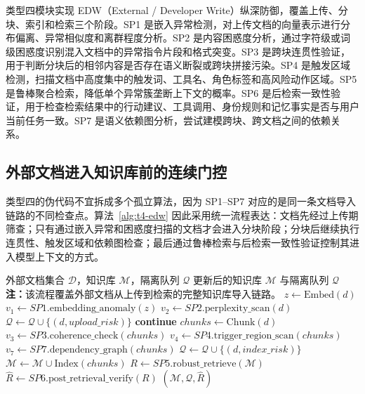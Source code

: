 \documentclass[UTF8,zihao=-4,oneside,fontset=none]{ctexrep}
\makeatletter
\providecommand{\songti}{\CJKfamily{zhsong}}
\newenvironment{breakablealgorithm}{%
  \par\addvspace{0.8em}%
  \zihao{-4}\songti\setstretch{1.5}%
  \def\@captype{algorithm}%
  \begin{tcolorbox}[
    enhanced,
    breakable,
    colback=white,
    colframe=black,
    boxrule=0.6pt,
    arc=0pt,
    outer arc=0pt,
    boxsep=0.35em,
    left=0.8em,
    right=0.8em,
    top=0.45em,
    bottom=0.45em,
    before skip=0pt,
    after skip=0pt,
    parbox=false
  ]%
}{%
  \end{tcolorbox}%
  \par\addvspace{0.8em}%
}
\makeatother
\begin{document}
	类型四模块实现 EDW（External / Developer Write）纵深防御，覆盖上传、分块、索引和检索三个阶段。SP1 是嵌入异常检测，对上传文档的向量表示进行分布偏离、异常相似度和离群程度分析。SP2 是内容困惑度分析，通过字符级或词级困惑度识别混入文档中的异常指令片段和格式突变。SP3 是跨块连贯性验证，用于判断分块后的相邻内容是否存在语义断裂或跨块拼接污染。SP4 是触发区域检测，扫描文档中高度集中的触发词、工具名、角色标签和高风险动作区域。SP5 是鲁棒聚合检索，降低单个异常簇垄断上下文的概率。SP6 是后检索一致性验证，用于检查检索结果中的行动建议、工具调用、身份规则和记忆事实是否与用户当前任务一致。SP7 是语义依赖图分析，尝试建模跨块、跨文档之间的依赖关系。
	
	\subsection{外部文档进入知识库前的连续门控}
	
	类型四的伪代码不宜拆成多个孤立算法，因为 SP1--SP7 对应的是同一条文档导入链路的不同检查点。算法~\ref{alg:t4-edw} 因此采用统一流程表达：文档先经过上传期筛查；只有通过嵌入异常和困惑度扫描的文档才会进入分块阶段；分块后继续执行连贯性、触发区域和依赖图检查；最后通过鲁棒检索与后检索一致性验证控制其进入模型上下文的方式。
	
	\begin{breakablealgorithm}
		\caption{类型四 EDW 外部批量写入纵深防御流程}
		\label{alg:t4-edw}
		\begin{algorithmic}[1]
			\Require 外部文档集合 $\mathcal{D}$，知识库 $\mathcal{M}$，隔离队列 $\mathcal{Q}$
			\Ensure 更新后的知识库 $\mathcal{M}$ 与隔离队列 $\mathcal{Q}$
			\Statex \textbf{注：}该流程覆盖外部文档从上传到检索的完整知识库导入链路。
			\State $z\leftarrow \mathrm{Embed}(d)$ 
			\State $v_1\leftarrow SP1.\mathrm{embedding\_anomaly}(z)$
			\State $v_2\leftarrow SP2.\mathrm{perplexity\_scan}(d)$
			\State $\mathcal{Q}\leftarrow \mathcal{Q}\cup\{(d,upload\_risk)\}$
			\State \textbf{continue}
			\EndIf
			\State $chunks\leftarrow \mathrm{Chunk}(d)$ 
			\State $v_3\leftarrow SP3.\mathrm{coherence\_check}(chunks)$
			\State $v_4\leftarrow SP4.\mathrm{trigger\_region\_scan}(chunks)$
			\State $v_7\leftarrow SP7.\mathrm{dependency\_graph}(chunks)$
			\State $\mathcal{Q}\leftarrow \mathcal{Q}\cup\{(d,index\_risk)\}$
			\Else
			\State $\mathcal{M}\leftarrow \mathcal{M}\cup\mathrm{Index}(chunks)$
			\EndIf
			\EndFor
			\State $R\leftarrow SP5.\mathrm{robust\_retrieve}(\mathcal{M})$
			\State $\hat{R}\leftarrow SP6.\mathrm{post\_retrieval\_verify}(R)$
			\State \Return $(\mathcal{M},\mathcal{Q},\hat{R})$
		\end{algorithmic}
	\end{breakablealgorithm}
	
\end{document}
